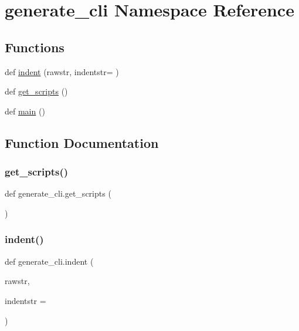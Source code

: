 \hypertarget{namespacegenerate__cli}{}\section{generate\+\_\+cli Namespace Reference}
\label{namespacegenerate__cli}
\subsection*{Functions}
\begin{DoxyCompactItemize}
\item 
def \hyperlink{namespacegenerate__cli_a398461fabd4559f4d4d041df98c8cb43}{indent} (rawstr, indentstr=\textquotesingle{} \textquotesingle{})
\item 
def \hyperlink{namespacegenerate__cli_a88235ac81a788e005e9aa0dd7624307c}{get\+\_\+scripts} ()
\item 
def \hyperlink{namespacegenerate__cli_ac2397b33242e0f40a20f33a2ea5beebf}{main} ()
\end{DoxyCompactItemize}


\subsection{Function Documentation}
\mbox{\label{namespacegenerate__cli_a88235ac81a788e005e9aa0dd7624307c}} 
\subsubsection{\texorpdfstring{get\+\_\+scripts()}{get\_scripts()}}
{\footnotesize\ttfamily def generate\+\_\+cli.\+get\+\_\+scripts (\begin{DoxyParamCaption}{ }\end{DoxyParamCaption})}

\mbox{\label{namespacegenerate__cli_a398461fabd4559f4d4d041df98c8cb43}} 
\subsubsection{\texorpdfstring{indent()}{indent()}}
{\footnotesize\ttfamily def generate\+\_\+cli.\+indent (\begin{DoxyParamCaption}\item[{}]{rawstr,  }\item[{}]{indentstr = {\ttfamily \textquotesingle{}~~~~\textquotesingle{}} }\end{DoxyParamCaption})}

